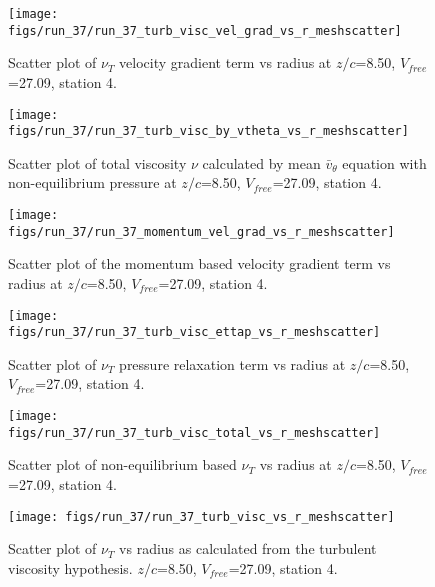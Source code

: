 \begin{figure}[H]
\centering
\texttt{[image: figs/run\_37/run\_37\_turb\_visc\_vel\_grad\_vs\_r\_meshscatter]}
\caption{Scatter plot of $\nu_T$ velocity gradient term vs radius at $z/c$=8.50, $V_{free}$=27.09, station 4.}
\end{figure}


\begin{figure}[H]
\centering
\texttt{[image: figs/run\_37/run\_37\_turb\_visc\_by\_vtheta\_vs\_r\_meshscatter]}
\caption{Scatter plot of total viscosity $\nu$ calculated by mean $\bar{v}_{\theta}$ equation with non-equilibrium pressure at $z/c$=8.50, $V_{free}$=27.09, station 4.}
\end{figure}


\begin{figure}[H]
\centering
\texttt{[image: figs/run\_37/run\_37\_momentum\_vel\_grad\_vs\_r\_meshscatter]}
\caption{Scatter plot of the momentum based velocity gradient term vs radius at $z/c$=8.50, $V_{free}$=27.09, station 4.}
\end{figure}


\begin{figure}[H]
\centering
\texttt{[image: figs/run\_37/run\_37\_turb\_visc\_ettap\_vs\_r\_meshscatter]}
\caption{Scatter plot of $\nu_T$ pressure relaxation term vs radius at $z/c$=8.50, $V_{free}$=27.09, station 4.}
\end{figure}


\begin{figure}[H]
\centering
\texttt{[image: figs/run\_37/run\_37\_turb\_visc\_total\_vs\_r\_meshscatter]}
\caption{Scatter plot of non-equilibrium based $\nu_T$ vs radius at $z/c$=8.50, $V_{free}$=27.09, station 4.}
\end{figure}


\begin{figure}[H]
\centering
\texttt{[image: figs/run\_37/run\_37\_turb\_visc\_vs\_r\_meshscatter]}
\caption{Scatter plot of $\nu_T$ vs radius as calculated from the turbulent viscosity hypothesis. $z/c$=8.50, $V_{free}$=27.09, station 4.}
\end{figure}


